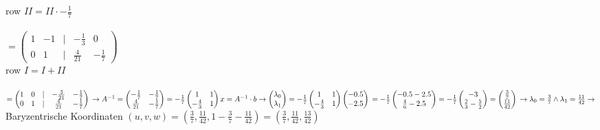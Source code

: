 row $II = II \cdot -\frac{1}{7}$\\\\
$=
\begin{pmatrix}
1 & -1 & | & -\frac{1}{3} & 0 \\
0 & 1 & | & \frac{4}{21} & -\frac{1}{7} 
\end{pmatrix}$\\
row $I = I + II$\\\\
$=
\begin{pmatrix}
1 & 0 & | & -\frac{3}{21} & -\frac{1}{7} \\
0 & 1 & | & \frac{4}{21} & -\frac{1}{7} 
\end{pmatrix}\\
\rightarrow A^{-1} = 
\begin{pmatrix}
-\frac{1}{7} & -\frac{1}{7} \\
\frac{4}{21} & -\frac{1}{7}
\end{pmatrix}
=
-\frac{1}{7}
\begin{pmatrix}
1 & 1 \\
-\frac{4}{3} & 1
\end{pmatrix}\\
x = A^{-1} \cdot b\\
\rightarrow
\begin{pmatrix}
\lambda_0 \\
\lambda_1
\end{pmatrix}
=
-\frac{1}{7}
\begin{pmatrix}
1 & 1 \\
-\frac{4}{3} & 1
\end{pmatrix}
\begin{pmatrix}
-0.5 \\
-2.5
\end{pmatrix}\\
=
-\frac{1}{7}
\begin{pmatrix}
-0.5 -2.5 \\
\frac{4}{6} - 2.5
\end{pmatrix}
=
-\frac{1}{7}
\begin{pmatrix}
-3 \\
\frac{2}{3} - \frac{5}{2}
\end{pmatrix}
=
\begin{pmatrix}
\frac{3}{7} \\
\frac{11}{42}
\end{pmatrix}\\
\rightarrow \lambda_0 = \frac{3}{7} \land \lambda_1 = \frac{11}{42}\\
\rightarrow$ Baryzentrische Koordinaten $(u, v, w) = (\frac{3}{7}, \frac{11}{42}, 1-\frac{3}{7}-\frac{11}{42}) = (\frac{3}{7}, \frac{11}{42}, \frac{13}{42})
$
